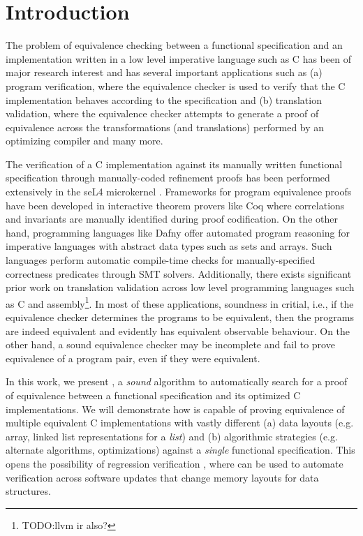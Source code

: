 \section{Introduction}
\label{sec:intro}
The problem of equivalence checking between a functional specification and an
implementation written in a low level imperative language such as C
has been of major research interest
and has several important applications such as (a) program verification, where
the equivalence checker is used to verify that the C implementation
behaves according to the specification and (b) translation validation, where
the equivalence checker attempts to generate a proof of equivalence across
the transformations (and translations) performed by an optimizing compiler
and many more.

The verification of a C implementation against its manually written
functional specification through manually-coded refinement proofs has been
performed extensively in the seL4 microkernel \cite{seL4}.
Frameworks for program equivalence proofs have been developed in interactive
theorem provers like Coq \cite{programEquivalenceInCoq} where correlations and invariants
are manually identified during proof codification.
On the other hand, programming languages like Dafny \cite{dafny} offer automated program
reasoning for imperative languages with abstract data types such as sets and arrays.
Such languages perform automatic compile-time checks for manually-specified
correctness predicates through SMT solvers.
Additionally, there exists significant prior work on translation validation
\cite{tvi,tristan_tv_eqsat11,stepp_eqsat_llvm11,eqsat,pec,zuck03,zuck05,heffter05,covac,c_to_verilog,kanade09,lopes16,tvoc_cav05,ddec,semalign,oopsla20,tv_oskernel,namjoshi13}
across low level programming languages such as C and assembly\footnote{TODO:llvm ir also?}.
In most of these applications, soundness in critial,
i.e., if the equivalence checker determines the programs to be equivalent, then the programs are indeed equivalent
and evidently has equivalent observable behaviour. On the other hand, a sound equivalence checker may be incomplete
and fail to prove equivalence of a program pair, even if they were equivalent.

In this work, we present \toolName{}, a {\em sound} algorithm to automatically search
for a proof of equivalence between a functional specification and its
optimized C implementations. We will demonstrate how \toolName{} is capable of
proving equivalence of multiple equivalent C implementations with vastly
different (a) data layouts (e.g. array, linked list representations for a {\em list})
and (b) algorithmic strategies (e.g. alternate algorithms, optimizations) against
a {\em single} functional specification.
This opens the possibility of regression verification \cite{strichman_regressverify,felsing14},
where \toolName{} can be used to automate verification across
software updates that change memory layouts for data structures.

